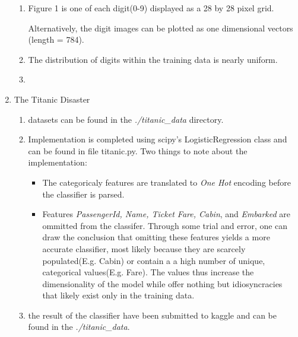 \documentclass{report}
\begin{document}
\begin{enumerate}
\begin{enumerate}[label=(\alph*)]
		\item Figure 1 is one of each digit(0-9) displayed as a 28 by 28 pixel grid.  
		\begin{center}
		\end{center}
		Alternatively, the digit images can be plotted as one dimensional vectors (length = 784).
		\begin{center}
		\end{center}
		\newpage
		\item The distribution of digits within the training data is nearly uniform.
		\begin{center}
		\end{center}	
		\item
	\end{enumerate}
	\item The Titanic Disaster
	\begin{enumerate}[label=(\alph*)]
		\item datasets can be found in the \textit{./titanic\_data} directory.
		\item Implementation is completed using scipy's LogisticRegression class and can be found in file titanic.py. Two things to note about the implementation:
		\begin{itemize}
		\item The categoricaly features are translated to \textit{One Hot} encoding before the classifier is parsed.
		\item Features \textit{PassengerId, Name, Ticket Fare, Cabin}, and \textit{Embarked} are ommitted from the classifer.  Through some trial and error, one can draw the conclusion that omitting these features yields a more accurate classifier, most likely because they are scarcely populated(E.g. Cabin) or contain a a high number of unique, categorical values(E.g. Fare). The values thus increase the dimensionality of the model while offer nothing but idiosyncracies that likely exist only in the training data.
		\end{itemize}
		\item the result of the classifier have been submitted to kaggle and can be found in the \textit{./titanic\_data}. 
	\end{enumerate}
	
\end{enumerate}
\end{document}
